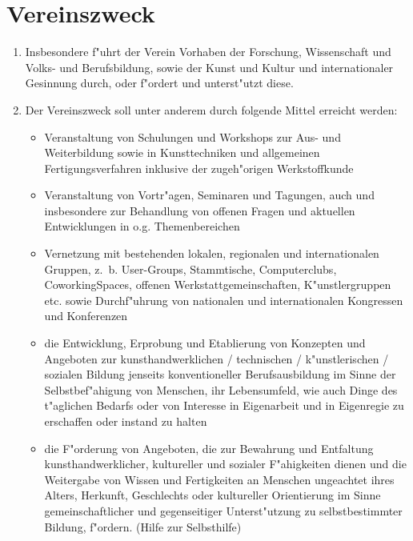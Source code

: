 \documentclass[a5paper, ngerman, 10pt]{scrreprt}
\begin{document}
\section{Vereinszweck}
\begin{enumerate}[(1)]
    \item Insbesondere f"uhrt der Verein Vorhaben der Forschung, Wissenschaft
        und Volks- und Berufsbildung, sowie der Kunst und Kultur und
        internationaler Gesinnung durch, oder f"ordert und unterst"utzt diese.
    \item Der Vereinszweck soll unter anderem durch folgende Mittel erreicht
        werden:
        \begin{itemize}
            \item Veranstaltung von Schulungen und Workshops zur Aus- und
                Weiterbildung sowie in Kunsttechniken und allgemeinen
                Fertigungsverfahren inklusive der zugeh"origen Werkstoffkunde
            \item Veranstaltung von Vortr"agen, Seminaren und Tagungen, auch und
                insbesondere zur Behandlung von offenen Fragen und aktuellen
                Entwicklungen in o.g. Themenbereichen
            \item Vernetzung mit bestehenden lokalen, regionalen und
                internationalen Gruppen, z.~b.  User-Groups, Stammtische,
                Computerclubs, CoworkingSpaces, offenen Werkstattgemeinschaften,
                K"unstlergruppen etc. sowie Durchf"uhrung von nationalen und
                internationalen Kongressen und Konferenzen
            \item die Entwicklung, Erprobung und Etablierung von Konzepten und
                Angeboten zur kunsthandwerklichen / technischen /
                k"unstlerischen / sozialen Bildung jenseits konventioneller
                Berufsausbildung im Sinne der Selbstbef"ahigung von Menschen,
                ihr Lebensumfeld, wie auch Dinge des t"aglichen Bedarfs oder von
                Interesse in Eigenarbeit und in Eigenregie zu erschaffen oder
                instand zu halten
            \item die F"orderung von Angeboten, die zur Bewahrung und Entfaltung
                kunsthandwerklicher, kultureller und sozialer F"ahigkeiten
                dienen und die Weitergabe von Wissen und Fertigkeiten an
                Menschen ungeachtet ihres Alters, Herkunft, Geschlechts oder
                kultureller Orientierung im Sinne gemeinschaftlicher und
                gegenseitiger Unterst"utzung zu selbstbestimmter Bildung,
                f"ordern. (Hilfe zur Selbsthilfe)
        \end{itemize}
\end{enumerate}
\end{document}
